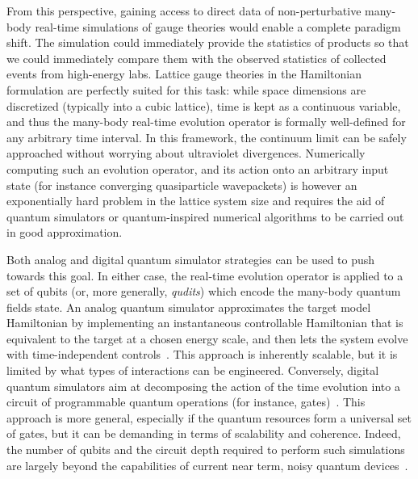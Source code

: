From this perspective, gaining access to direct data of non-perturbative many-body real-time simulations of gauge theories would enable a complete paradigm shift. The simulation could immediately provide the statistics of products so that we could immediately compare them with the observed statistics of collected events from high-energy labs. Lattice gauge theories in the Hamiltonian formulation are perfectly suited for this task: while space dimensions are discretized (typically into a cubic lattice), time is kept as a continuous variable, and thus the many-body real-time evolution operator is formally well-defined for any arbitrary time interval. In this framework, the continuum limit can be safely approached without worrying about ultraviolet divergences.
Numerically computing such an evolution operator, and its action onto an arbitrary input state (for instance converging quasiparticle wavepackets) is however an exponentially hard problem in the lattice system size and requires the aid of quantum simulators or quantum-inspired numerical algorithms to be carried out in good approximation.

Both analog and digital quantum simulator strategies can be used to push towards this goal. In either case, the real-time evolution operator is applied to a set of qubits (or, more generally, \textit{qudits}) which encode the many-body quantum fields state. An analog quantum simulator approximates the target model Hamiltonian by implementing an instantaneous controllable Hamiltonian that is equivalent to the target at a chosen energy scale, and then lets the system evolve with time-independent controls~\cite{Banerjee2013}. This approach is inherently scalable, but it is limited by what types of interactions can be engineered. Conversely, digital quantum simulators aim at decomposing the action of the time evolution into a circuit of programmable quantum operations (for instance, gates)~\cite{Martinez2016}. This approach is more general, especially if the quantum resources form a universal set of gates, but it can be demanding in terms of scalability and coherence. Indeed, the number of qubits and the circuit depth required to perform such simulations are largely beyond the capabilities of current near term, noisy quantum 
devices~\cite{Lloyd96,Jordan2012}.

